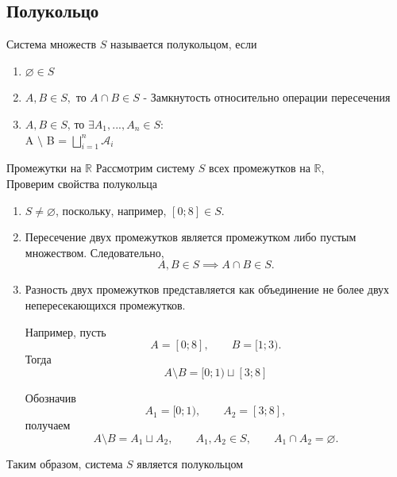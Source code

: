 \subsection{Полукольцо}
\begin{definition}
    Система множеств $S$ называется полукольцом, если
    \begin{enumerate}[label=\arabic*)]
        \item $\varnothing \in S$
        \item $A, B \in S,\text{ то }  A \cap B \in S $ - Замкнутость относительно операции пересечения
        \item $A, B \in S \text{, то  } \exists A_1, ..., A_n \in S:$
        \\
        A $\setminus$ B = $\bigsqcup_{i=1}^{n} \mathcal{A}_i$
        
        
    \end{enumerate}
\end{definition}
\begin{example}
    Промежутки на $\mathbb{R}$
    Рассмотрим систему $S$ всех промежутков на $\mathbb{R}$, \\
    Проверим свойства полукольца

    \begin{enumerate}[label=\arabic*)]
        \item $S \neq \varnothing$, поскольку, например, $[0;8] \in S$.

        \item Пересечение двух промежутков является промежутком
        либо пустым множеством. Следовательно,
        \[
            A, B \in S \implies A \cap B \in S.
        \]

        \item Разность двух промежутков представляется
        как объединение не более двух непересекающихся
        промежутков.

        Например, пусть
        \[
            A = [0;8], \qquad B = [1;3).
        \]
        Тогда
        \[
            A \setminus B = [0;1) \sqcup [3;8]
        \]
        

        Обозначив
        \[
            A_1 = [0;1), \qquad A_2 = [3;8],
        \]
        получаем
        \[
            A \setminus B = A_1 \sqcup A_2,
            \qquad A_1, A_2 \in S,
            \qquad A_1 \cap A_2 = \varnothing.
        \]
    \end{enumerate}

    Таким образом, система $S$ является полукольцом
\end{example}

